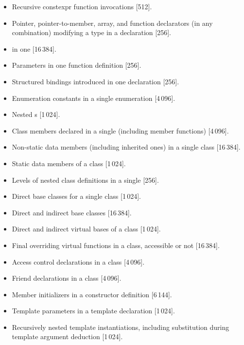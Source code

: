 \begin{itemize}
\item%
Recursive constexpr function invocations [512].
\item%
Pointer,
pointer-to-member,
array, and
function
declarators (in any combination)
modifying a type in a declaration [256].
\item%
 in one  [16\,384].
\item%
Parameters in one function definition [256].
\item%
Structured bindings introduced in one declaration [256].
\item%
Enumeration constants in a single enumeration [4\,096].
\item%
Nested s [1\,024].

\item%
Class members declared in a single 
(including member functions) [4\,096].
\item%
Non-static data members (including inherited ones) in a single class [16\,384].
\item%
Static data members of a class [1\,024].
\item%
Levels of nested class definitions
in a single
[256].
\item%
Direct base classes for a single class [1\,024].
\item%
Direct and indirect base classes [16\,384].
\item%
Direct and indirect virtual bases of a class [1\,024].
\item%
Final overriding virtual functions in a class,
accessible or not [16\,384].
\item%
Access control declarations in a class [4\,096].
\item%
Friend declarations in a class [4\,096].
\item%
Member initializers in a constructor definition [6\,144].

\item%
Template parameters in a template declaration [1\,024].
\item%
Recursively nested template instantiations, including substitution
during template argument deduction [1\,024].


\end{itemize}
